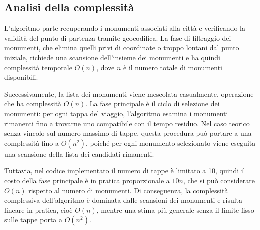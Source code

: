 \subsection*{Analisi della complessità}
\vspace{-5pt}
L'algoritmo parte recuperando i monumenti associati alla città e verificando la validità del punto di partenza tramite geocodifica. 
La fase di filtraggio dei monumenti, che elimina quelli privi di coordinate o troppo lontani dal punto iniziale, richiede una scansione dell'insieme dei monumenti e ha quindi complessità temporale $O(n)$, dove $n$ è il numero totale di monumenti disponibili.

Successivamente, la lista dei monumenti viene mescolata casualmente, operazione che ha complessità $O(n)$.
La fase principale è il ciclo di selezione dei monumenti: per ogni tappa del viaggio, l'algoritmo esamina i monumenti rimanenti fino a trovarne uno compatibile con il tempo residuo. 
Nel caso teorico senza vincolo sul numero massimo di tappe, questa procedura può portare a una complessità fino a $O(n^2)$, poiché per ogni monumento selezionato viene eseguita una scansione della lista dei candidati rimanenti.

Tuttavia, nel codice implementato il numero di tappe è limitato a 10, quindi il costo della fase principale è in pratica proporzionale a $10n$, che si può considerare $O(n)$ rispetto al numero di monumenti. 
Di conseguenza, la complessità complessiva dell'algoritmo è dominata dalle scansioni dei monumenti e risulta lineare in pratica, cioè $O(n)$, mentre una stima più generale senza il limite fisso sulle tappe porta a $O(n^2)$.